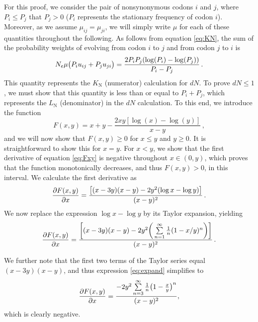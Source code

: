 \documentclass[11pt]{article}
\begin{document}
For this proof, we consider the pair of nonsynonymous codons $i$ and $j$, where $P_i \leq P_j$ that $P_j > 0$ ($P_i$ represents the stationary frequency of codon $i$). Moreover, as we assume $\mu_{ij} = \mu_{ji}$, we will simply write $\mu$ for each of these quantities throughout the following. As follows from equation \eqref{eq:KN}, the sum of the probability weights of evolving from codon $i$ to $j$ and from codon $j$ to $i$ is
\begin{equation}
N_e\mu \big{(} P_iu_{ij} + P_ju_{ji} \big{)} = \frac{2P_iP_j(\log(P_i) - \log(P_j))}{P_i - P_j} \,.
\end{equation}
This quantity represents the $K_\text{N}$ (numerator) calculation for $dN$. To prove $dN \leq 1$, we must show that this quantity is less than or equal to $P_i + P_j$, which represents the $L_\text{N}$ (denominator) in the $dN$ calculation. To this end, we introduce the function 
\begin{equation}\label{eq:Fxy}
F(x,y) = x + y - \frac{2xy[\log(x) - \log(y)]}{x - y} \,,
\end{equation}
and we will now show that $F(x,y) \geq 0$ for $x \leq y$ and $y \geq 0 $. It is straightforward to show this for $x=y$. For $x < y$, we show that the first derivative of equation \eqref{eq:Fxy} is negative throughout $x \in (0,y)$, which proves that the function monotonically decreases, and thus $F(x,y) > 0$, in this interval. We calculate the first derivative as 
\begin{equation}
\frac{\partial{F(x,y)}}{\partial{x}} = \frac{\big{[} (x-3y)(x-y) - 2y^2(\log{x} - \log{y}) \big{]}}{(x-y)^2} \,.
\end{equation}
We now replace the expression $\log{x} - \log{y}$ by its Taylor expansion, yielding
\begin{equation}\label{eq:expand}
	\frac{\partial{F(x,y)}}{\partial{x}} = 
	\frac{ \bigg{[} (x-3y)(x-y) - 2y^2\bigg{(}\sum\limits_{n=1}^\infty \frac{1}{n} (1-x/y)^n\bigg{)} \bigg{]}}{(x-y)^2} \,.
\end{equation}

We further note that the first two terms of the Taylor series equal $(x-3y)(x-y)$, and thus expression \eqref{eq:expand} simplifies to 
\begin{equation}
\frac{\partial{F(x,y)}}{\partial{x}} = \frac{-2y^2\sum\limits_{n=3}^\infty \frac{1}{n} \big{(}1-\frac{x}{y}\big{)}^n}{(x-y)^2} ,
\end{equation}
which is clearly negative. 


\bigskip
\end{document}
